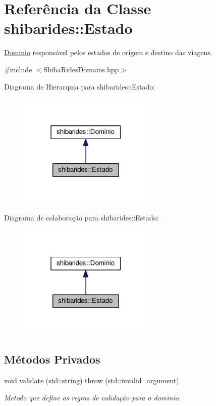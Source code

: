 \hypertarget{classshibarides_1_1Estado}{}\section{Referência da Classe shibarides\+:\+:Estado}
\label{classshibarides_1_1Estado}


\hyperlink{classshibarides_1_1Dominio}{Dominio} responsável pelos estados de origem e destino das viagens.  




{\ttfamily \#include $<$Shiba\+Rides\+Domains.\+hpp$>$}



Diagrama de Hierarquia para shibarides\+:\+:Estado\+:\nopagebreak
\begin{figure}[H]
\begin{center}
\leavevmode
\includegraphics[width=183pt]{classshibarides_1_1Estado__inherit__graph}
\end{center}
\end{figure}


Diagrama de colaboração para shibarides\+:\+:Estado\+:\nopagebreak
\begin{figure}[H]
\begin{center}
\leavevmode
\includegraphics[width=183pt]{classshibarides_1_1Estado__coll__graph}
\end{center}
\end{figure}
\subsection*{Métodos Privados}
\begin{DoxyCompactItemize}
\item 
void \hyperlink{classshibarides_1_1Estado_a87dff745c1b1f487eae4bd4461e8a1ef}{validate} (std\+::string)  throw (std\+::invalid\+\_\+argument)
\begin{DoxyCompactList}\small\item\em Metodo que define as regras de validação para o dominio. \end{DoxyCompactList}\end{DoxyCompactItemize}
